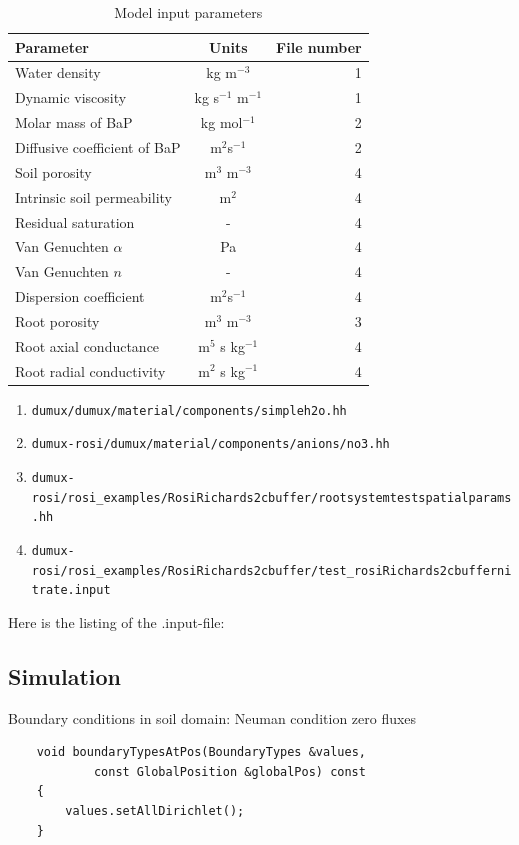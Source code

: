 \begin{table}[h!]
\caption{Model input parameters}
\label{tab:inputs} %
\begin{tabular}{l|c||r}
\textbf{Parameter}  & \textbf{Units}  & \textbf{File number}\tabularnewline
\hline 
Water density  & kg m$^{-3}$  & 1\tabularnewline
Dynamic viscosity  & kg s$^{-1}$ m$^{-1}$ & 1\tabularnewline
Molar mass of BaP & kg mol$^{-1}$ & 2\tabularnewline
Diffusive coefficient of BaP & m$^{2}$s$^{-1}$ & 2\tabularnewline
Soil porosity  & m$^{3}$ m$^{-3}$  & 4\tabularnewline
Intrinsic soil permeability  & m$^{2}$  & 4\tabularnewline
Residual saturation  & -  & 4\tabularnewline
Van Genuchten $\alpha$  & Pa  & 4\tabularnewline
Van Genuchten $n$  & -  & 4\tabularnewline
Dispersion coefficient & m$^{2}$s$^{-1}$ & 4\tabularnewline
Root porosity  & m$^{3}$ m$^{-3}$  & 3\tabularnewline
Root axial conductance  & m$^{5}$ s kg$^{-1}$  & 4\tabularnewline
Root radial conductivity  & m$^{2}$ s kg$^{-1}$  & 4\tabularnewline
\end{tabular}
\end{table}

\begin{enumerate}
\item \verb+dumux/dumux/material/components/simpleh2o.hh+ 
\item \verb+dumux-rosi/dumux/material/components/anions/no3.hh+ 
\item \verb+dumux-rosi/rosi_examples/RosiRichards2cbuffer/rootsystemtestspatialparams.hh+ 
\item \verb+dumux-rosi/rosi_examples/RosiRichards2cbuffer/test_rosiRichards2cbuffernitrate.input+ 
\end{enumerate}
Here is the listing of the .input-file: 



\subsection*{Simulation}

Boundary conditions in soil domain: Neuman condition zero fluxes 

\begin{lstlisting}
    void boundaryTypesAtPos(BoundaryTypes &values,
            const GlobalPosition &globalPos) const
    {         
		values.setAllDirichlet();
    }
\end{lstlisting}

